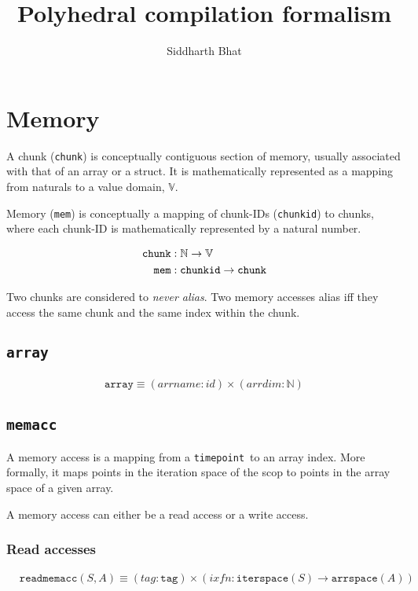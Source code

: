 \documentclass{article}
\title{Polyhedral compilation formalism}
\author{Siddharth Bhat}
\newcommand{\N}{\mathbb{N}}
\newcommand{\val}{\mathbb{V}}
\newcommand{\chunkid}{\texttt{chunkid}}
\newcommand{\chunk}{\texttt{chunk}}
\newcommand{\mem}{\texttt{mem}}
\newcommand{\memacc}{\texttt{memacc}}
\newcommand{\timepoint}{\texttt{timepoint}}
\newcommand{\iterspace}{\texttt{iterspace}}
\newcommand{\arrspace}{\texttt{arrspace}}
\newcommand{\readmemacc}{\texttt{readmemacc}}
\newcommand{\readtag}{\texttt{tag}}
\newcommand{\arr}{\texttt{array}}
\begin{document}
\maketitle
\date{}
\tableofcontents

\section{Memory}
A chunk (\chunk) is conceptually contiguous section of memory, usually associated
with that of an array or a struct. It is mathematically represented as 
a mapping from naturals to a value domain, $\val$.

Memory (\mem) is conceptually a mapping of chunk-IDs (\chunkid) to chunks, where each chunk-ID
is mathematically represented by a natural number.


\begin{align*}
    \chunk &: \N \to \val \\ 
    \mem &: \text{\chunkid} \to \chunk
\end{align*}

Two chunks are considered to \textit{never alias}. Two memory accesses alias
iff they access the same chunk and the same index within the chunk.


\subsection{\arr}
\begin{align*}
    \arr \equiv (arrname: id) \times (arrdim: \N)
\end{align*}

\subsection{\memacc}
A memory access is a mapping from a \timepoint~to an array index. More formally,
it maps points in the iteration space of the scop to points in the array space
of a given array.

A memory access can either be a read access or a write access.

\subsubsection{Read accesses}
\begin{align*}
    &\readmemacc(S, A) \equiv  (tag: \readtag) \times (ixfn: \iterspace(S) \to \arrspace(A)) \\
\end{align*}
\end{document}
